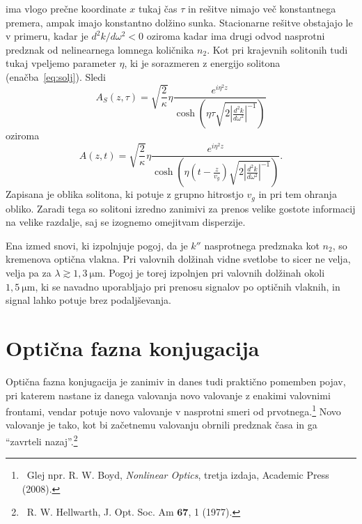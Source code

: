 ima vlogo prečne koordinate $x$ tukaj čas $\tau$ in rešitve nimajo več konstantnega premera,
ampak imajo konstantno dolžino sunka. Stacionarne rešitve obstajajo le v primeru, kadar je  $d^{2}k/d\omega^{2}<0$ oziroma kadar ima drugi odvod nasprotni predznak od nelinearnega lomnega količnika $n_2$. Kot pri krajevnih solitonih tudi tukaj vpeljemo parameter $\eta$, ki je sorazmeren 
z energijo solitona (enačba~\ref{eq:solj}). Sledi 
\begin{equation}
A_S\left(z,\tau\right)=\sqrt{\frac{2}{\kappa}}\eta\frac{e^{i\eta^{2}z}}{{\cosh}\left(\eta \tau 
\sqrt{2\left|\frac{d^{2}k}{d\omega^{2}}\right|^{-1}}\right)}
\end{equation}
oziroma
\begin{equation}
A\left(z,t\right)=\sqrt{\frac{2}{\kappa}}\eta\frac{e^{i\eta^{2}z}}{{\cosh}\left(\eta (t-\frac{z}{v_g}) 
\sqrt{2\left|\frac{d^{2}k}{d\omega^{2}}\right|^{-1}}\right)}.
\label{8.96}
\end{equation}
Zapisana je oblika solitona, ki potuje z grupno hitrostjo $v_g$ in pri tem ohranja obliko. Zaradi tega
so solitoni izredno zanimivi za prenos velike gostote informacij na velike razdalje, saj se izognemo
omejitvam disperzije. 

\begin{remark}
Ena izmed snovi, ki izpolnjuje pogoj, da je $k''$ nasprotnega predznaka kot $n_2$, so kremenova 
optična vlakna. Pri valovnih dolžinah vidne svetlobe to sicer ne velja, velja pa za 
$\lambda \gtrsim 1,3~\si{\micro\metre}$.
Pogoj je torej izpolnjen pri valovnih dolžinah okoli $1,5~\si{\micro\metre}$, ki se navadno uporabljajo 
pri prenosu signalov po optičnih vlaknih, in signal lahko potuje brez podaljševanja. 
\end{remark}

\section{Optična fazna konjugacija}
Optična fazna konjugacija je zanimiv in danes tudi praktično pomemben
pojav, pri katerem nastane iz danega valovanja novo valovanje z enakimi valovnimi
frontami, vendar potuje novo valovanje v nasprotni smeri od prvotnega.\footnote{~Glej npr. R.
W. Boyd, {\it Nonlinear Optics}, tretja izdaja, Academic Press (2008).} Novo valovanje je tako,
kot bi začetnemu valovanju obrnili predznak časa in ga ``zavrteli nazaj''.\footnote{~R. W. Hellwarth, 
J. Opt. Soc. Am $\mathbf{67}$, 1 (1977).}

